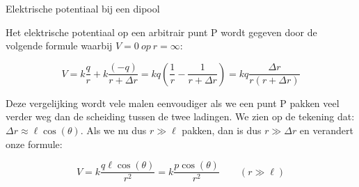 \begin{app}{Elektrische potentiaal bij een dipool}

    \begin{minipage}{.68 \textwidth}
        \vspace{-0.4cm}
        Het elektrische potentiaal op een arbitrair punt P wordt gegeven door de volgende formule waarbij $ V = 0 \ op \ r = \infty $:
        
        \begin{equation*}
            V = k\dfrac{q}{r} + k \dfrac{(-q)}{r + \Delta r} = kq(\dfrac{1}{r} - \dfrac{1}{r+ \Delta r}) = kq\dfrac{\Delta r}{r(r+\Delta r)}
        \end{equation*}
        
        \noindent Deze vergelijking wordt vele malen eenvoudiger als we een punt P pakken veel verder weg dan de scheiding tussen de twee ladingen. We zien op de tekening dat: $ \Delta r \approx \ell\cos(\theta) $. Als we nu dus $ r \gg \ell $ pakken, dan is dus $ r \gg \Delta r $ en verandert onze formule:
        
        \begin{equation*}
            V = k\dfrac{q\ell\cos(\theta)}{r^2} = k\dfrac{p\cos(\theta)}{r^2} \quad \quad (r \gg \ell)
        \end{equation*}
        
        
    

\end{minipage}
\end{app}
